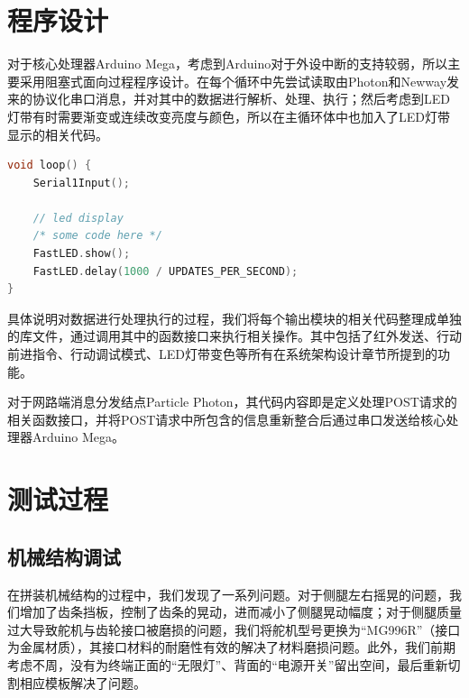 \section{程序设计}
    \hspace{1.5em}对于核心处理器Arduino Mega，考虑到Arduino对于外设中断的支持较弱，所以主要采用阻塞式面向过程程序设计。在每个循环中先尝试读取由Photon和Newway发来的协议化串口消息，并对其中的数据进行解析、处理、执行；然后考虑到LED灯带有时需要渐变或连续改变亮度与颜色，所以在主循环体中也加入了LED灯带显示的相关代码。
    \begin{lstlisting}[language={C++}]
void loop() {
    Serial1Input();

    // led display
    /* some code here */
    FastLED.show();
    FastLED.delay(1000 / UPDATES_PER_SECOND);
}
    \end{lstlisting}
    \hspace{1.5em}具体说明对数据进行处理执行的过程，我们将每个输出模块的相关代码整理成单独的库文件，通过调用其中的函数接口来执行相关操作。其中包括了红外发送、行动前进指令、行动调试模式、LED灯带变色等所有在系统架构设计章节所提到的功能。

    \hspace{1.5em}对于网路端消息分发结点Particle Photon，其代码内容即是定义处理POST请求的相关函数接口，并将POST请求中所包含的信息重新整合后通过串口发送给核心处理器Arduino Mega。

\newpage

\section{测试过程}
    \subsection{机械结构调试}
    \hspace{1.5em}在拼装机械结构的过程中，我们发现了一系列问题。对于侧腿左右摇晃的问题，我们增加了齿条挡板，控制了齿条的晃动，进而减小了侧腿晃动幅度；对于侧腿质量过大导致舵机与齿轮接口被磨损的问题，我们将舵机型号更换为“MG996R”（接口为金属材质），其接口材料的耐磨性有效的解决了材料磨损问题。此外，我们前期考虑不周，没有为终端正面的“无限灯”、背面的“电源开关”留出空间，最后重新切割相应模板解决了问题。

